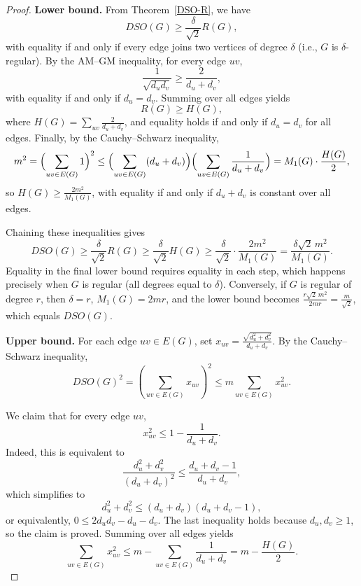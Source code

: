 \documentclass{article}
\theoremstyle{definition}
\begin{document}
\begin{proof}
\textbf{Lower bound.}
From Theorem~\ref{DSO-R}, we have
\[
DSO(G) \ge \frac{\delta}{\sqrt{2}} R(G),
\]
with equality if and only if every edge joins two vertices of degree $\delta$ (i.e., $G$ is $\delta$-regular).
By the AM--GM inequality, for every edge $uv$,
\[
\frac{1}{\sqrt{d_u d_v}} \ge \frac{2}{d_u+d_v},
\]
with equality if and only if $d_u=d_v$.
Summing over all edges yields
\[
R(G) \ge H(G),
\]
where $H(G)=\sum_{uv} \frac{2}{d_u+d_v}$, and equality holds if and only if $d_u=d_v$ for all edges.
Finally, by the Cauchy--Schwarz inequality,
\[
m^2 = \Bigl(\sum_{uv\in E(G)} 1\Bigr)^2
\le \Bigl(\sum_{uv\in E(G)} (d_u+d_v)\Bigr)
\Bigl(\sum_{uv\in E(G)} \frac{1}{d_u+d_v}\Bigr)
= M_1(G)\cdot \frac{H(G)}{2},
\]
so $H(G) \ge \frac{2m^2}{M_1(G)}$, with equality if and only if $d_u+d_v$ is constant over all edges.

Chaining these inequalities gives
\[
DSO(G) \ge \frac{\delta}{\sqrt{2}} R(G)
\ge \frac{\delta}{\sqrt{2}} H(G)
\ge \frac{\delta}{\sqrt{2}}\cdot \frac{2m^2}{M_1(G)}
= \frac{\delta\sqrt{2}\,m^2}{M_1(G)}.
\]
Equality in the final lower bound requires equality in each step, which happens precisely when $G$ is regular (all degrees equal to $\delta$). Conversely, if $G$ is regular of degree $r$, then $\delta=r$, $M_1(G)=2mr$, and the lower bound becomes $\frac{r\sqrt{2}\,m^2}{2mr} = \frac{m}{\sqrt{2}}$, which equals $DSO(G)$.

\noindent
\textbf{Upper bound.}
For each edge $uv\in E(G)$, set
$
x_{uv}=\frac{\sqrt{d_u^2+d_v^2}}{d_u+d_v}.
$
By the Cauchy–Schwarz inequality,
\[
DSO(G)^2 = \left(\sum_{uv\in E(G)} x_{uv}\right)^2
\le m \sum_{uv\in E(G)} x_{uv}^2.
\]

We claim that for every edge $uv$,
\[
x_{uv}^2 \le 1-\frac{1}{d_u+d_v}.
\]
Indeed, this is equivalent to
\[
\frac{d_u^2+d_v^2}{(d_u+d_v)^2} \le \frac{d_u+d_v-1}{d_u+d_v},
\]
which simplifies to
\[
d_u^2+d_v^2 \le (d_u+d_v)(d_u+d_v-1),\]
or equivalently, $0 \le 2d_ud_v-d_u-d_v.$
The last inequality holds because $d_u,d_v\ge 1$, so  the claim is proved.
Summing over all edges yields
\[
\sum_{uv\in E(G)} x_{uv}^2
\le m - \sum_{uv\in E(G)}\frac{1}{d_u+d_v}
= m - \frac{H(G)}{2}.
\]


\end{proof}
\end{document}
